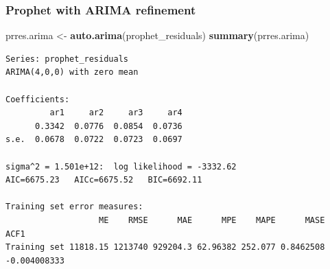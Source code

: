 \documentclass[
]{article}
\newenvironment{Shaded}{\begin{snugshade}}{\end{snugshade}}
\newcommand{\AttributeTok}[1]{\textcolor[rgb]{0.13,0.29,0.53}{#1}}
\newcommand{\ConstantTok}[1]{\textcolor[rgb]{0.56,0.35,0.01}{#1}}
\newcommand{\DecValTok}[1]{\textcolor[rgb]{0.00,0.00,0.81}{#1}}
\newcommand{\FunctionTok}[1]{\textcolor[rgb]{0.13,0.29,0.53}{\textbf{#1}}}
\newcommand{\NormalTok}[1]{#1}
\newcommand{\OtherTok}[1]{\textcolor[rgb]{0.56,0.35,0.01}{#1}}
\newcommand{\SpecialCharTok}[1]{\textcolor[rgb]{0.81,0.36,0.00}{\textbf{#1}}}
\newcommand{\StringTok}[1]{\textcolor[rgb]{0.31,0.60,0.02}{#1}}
\begin{document}
\begin{Shaded}
\end{Shaded}

\subsubsection{Prophet with ARIMA
refinement}\label{prophet-with-arima-refinement}

\begin{Shaded}
\begin{Highlighting}[]
\NormalTok{prres.arima }\OtherTok{\textless{}{-}} \FunctionTok{auto.arima}\NormalTok{(prophet\_residuals)}
\FunctionTok{summary}\NormalTok{(prres.arima)}
\end{Highlighting}
\end{Shaded}

\begin{verbatim}
Series: prophet_residuals 
ARIMA(4,0,0) with zero mean 

Coefficients:
         ar1     ar2     ar3     ar4
      0.3342  0.0776  0.0854  0.0736
s.e.  0.0678  0.0722  0.0723  0.0697

sigma^2 = 1.501e+12:  log likelihood = -3332.62
AIC=6675.23   AICc=6675.52   BIC=6692.11

Training set error measures:
                   ME    RMSE      MAE      MPE    MAPE      MASE         ACF1
Training set 11818.15 1213740 929204.3 62.96382 252.077 0.8462508 -0.004008333
\end{verbatim}
\end{document}
